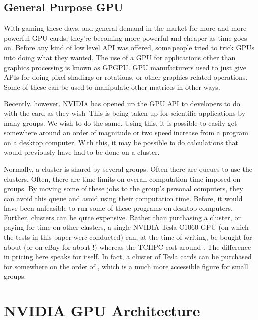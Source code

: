 \documentclass[a4paper,12pt]{report}
\begin{document}
\section{General Purpose GPU}

With gaming these days, and general demand in the market for more and more powerful GPU cards, they're becoming more powerful and cheaper as time goes on\cite[p~21]{KirkAndHwu}.
Before any kind of low level API was offered, some people tried to trick GPUs into doing what they wanted.
The use of a GPU for applications other than graphics processing is known as GPGPU\cite[p~7]{KirkAndHwu}.
GPU manufacturers used to just give APIs for doing pixel shadings or rotations, or other graphics related operations.
Some of these can be used to manipulate other matrices in other ways.

Recently, however, NVIDIA has opened up the GPU API to developers to do with the card as they wish.
This is being taken up for scientific applications by many groups.
We wish to do the same.
Using this, it is possible to easily get somewhere around an order of magnitude or two speed increase from a program on a desktop computer\cite[p~10]{KirkAndHwu}.
With this, it may be possible to do calculations that would previously have had to be done on a cluster.

Normally, a cluster is shared by several groups.
Often there are queues to use the clusters.
Often, there are time limits on overall computation time imposed on groups.
By moving some of these jobs to the group's personal computers, they can avoid this queue and avoid using their computation time.
Before, it would have been unfeasible to run some of these programs on desktop computers.
Further, clusters can be quite expensive.
Rather than purchasing a cluster, or paying for time on other clusters, a single NVIDIA Tesla C1060 GPU (on which the tests in this paper were conducted) can, at the time of writing, be bought for about  (or on eBay for about !) whereas the TCHPC cost around \cite{TCHPC_cost}.
The difference in pricing here speaks for itself.
In fact, a cluster of Tesla cards can be purchased for somewhere on the order of , which is a much more accessible figure for small groups.




\chapter{NVIDIA GPU Architecture}
\end{document}
